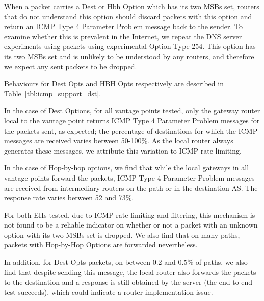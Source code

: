 \documentclass[conference]{IEEEtran}
\begin{document}
When a packet carries a Dest or Hbh Option which has its two MSBs set, routers that do not understand this option should discard packets with this option and return an ICMP Type 4 Parameter Problem message back to the sender. To examine whether this is prevalent in the Internet, we repeat the DNS server experiments using packets using experimental Option Type 254. This option has its two MSBs set and is unlikely to be understood by any routers, and therefore we expect any sent packets to be dropped.

Behaviours for Dest Opts and HBH Opts respectively are described in Table~\ref{tbl:icmp_support_dst}.

In the case of Dest Options, for all vantage points tested, only the gateway router local to the vantage point returns ICMP Type 4 Parameter Problem messages for the packets sent, as expected; the percentage of destinations for which the ICMP messages are received varies between 50-100\%. As the local router always generates these messages, we attribute this variation to ICMP rate limiting. 

In the case of Hop-by-hop options, we find that while the local gateways in all vantage points forward the packets,  ICMP Type 4 Parameter Problem messages are received from intermediary routers on the path or in the destination AS. The response rate varies between 52 and 73\%. 

For both EHs tested, due to ICMP rate-limiting and filtering, this mechanism is not found to be a reliable indicator on whether or not a packet with an unknown option with its two MSBs set is dropped. We also find that on many paths, packets with Hop-by-Hop Options are forwarded nevertheless.

In addition, for Dest Opts packets, on between 0.2 and 0.5\% of paths, we also find that despite sending this message, the local router also forwards the packets to the destination and a response is still obtained by the server (the end-to-end test succeeds), which could indicate a router implementation issue.
\end{document}
